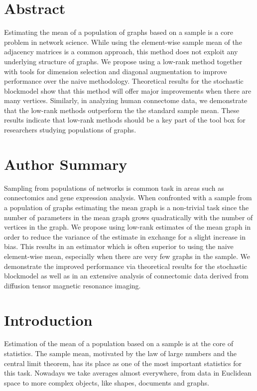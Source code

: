 \documentclass[10pt,letterpaper]{article}
\begin{document}
\section*{Abstract}
Estimating the mean of a population of graphs based on a sample is a core problem in network science.
While using the element-wise sample mean of the adjacency matrices is a common approach, this method does not exploit any underlying structure of graphs.
We propose using a low-rank method together with tools for dimension selection and diagonal augmentation to improve performance over the naive methodology.
Theoretical results for the stochastic blockmodel show that this method will offer major improvements when there are many vertices.
Similarly, in analyzing human connectome data, we demonstrate that the low-rank methods outperform the the standard sample mean.
These results indicate that low-rank methods should be a key part of the tool box for researchers studying populations of graphs.


\section*{Author Summary}
Sampling from populations of networks is common task in areas such as connectomics and gene expression analysis.
When confronted with a sample from a population of graphs estimating the mean graph is a non-trivial task since the number of parameters in the mean graph grows quadratically with the number of vertices in the graph.
We propose using low-rank estimates of the mean graph in order to reduce the variance of the estimate in exchange for a slight increase in bias.
This results in an estimator which is often superior to using the naive element-wise mean, especially when there are very few graphs in the sample.
We demonstrate the improved performance via theoretical results for the stochastic blockmodel as well as in an extensive analysis of connectomic data derived from diffusion tensor magnetic resonance imaging.

\linenumbers



\section{Introduction}

Estimation of the mean of a population based on a sample is at the core of statistics.
The sample mean, motivated by the law of large numbers and the central limit theorem, has its place as one of the most important statistics for this task.
Nowadays we take averages almost everywhere, from data in Euclidean space to more complex objects, like shapes, documents and graphs.
\end{document}

